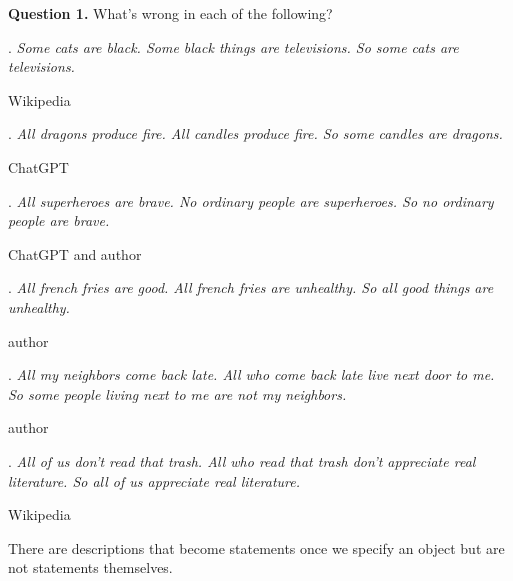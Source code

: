 \documentclass[oneside,12pt]{article}
\begin{document}
\hspace{-0.75in} \textbf{Question 1.} What's wrong in each of the following?
\begin{mdframed}
. \emph{Some cats are black. Some black things are televisions. So some cats are televisions.}

\hfill Wikipedia

. \emph{All dragons produce fire. All candles produce fire. So some candles are dragons.}

\hfill ChatGPT

. \emph{All superheroes are brave. No ordinary people are superheroes. So no ordinary people are brave.}

\hfill ChatGPT and author

. \emph{All french fries are good. All french fries are unhealthy. So all good things are unhealthy.}

\hfill author

. \emph{All my neighbors come back late. All who come back late live next door to me. So some people living next to me are not my neighbors.}

\hfill author

. \emph{All of us don't read that trash. All who read that trash don't appreciate real literature. So all of us appreciate real literature.}

\hfill Wikipedia





\end{mdframed}

\leavevmode

There are descriptions that become statements once we specify an object but are not statements themselves.

\leavevmode
\end{document}
